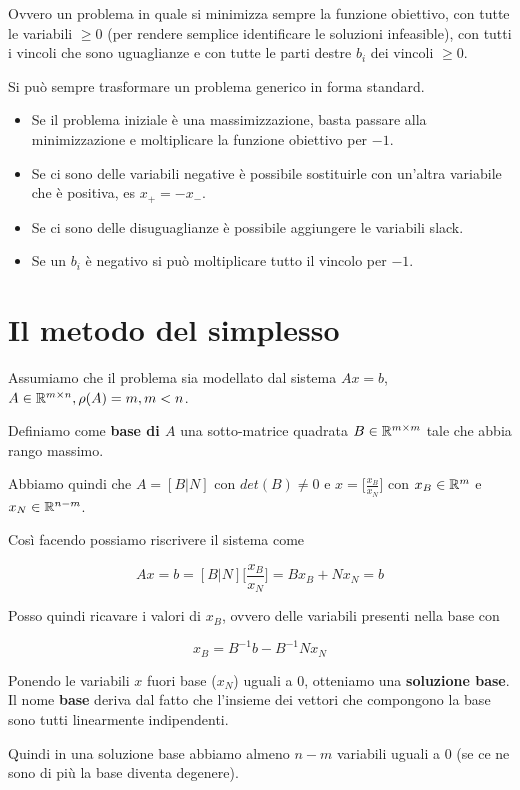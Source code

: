 \noindent Ovvero un problema in quale si minimizza sempre la funzione obiettivo, con tutte le variabili $\geq 0$ (per rendere semplice identificare le soluzioni infeasible), con tutti i vincoli che sono uguaglianze e con tutte le parti destre $b_i$ dei vincoli $\geq 0$.

Si può sempre trasformare un problema generico in forma standard.

\begin{itemize}
	\item Se il problema iniziale è una massimizzazione, basta passare alla minimizzazione e moltiplicare la funzione obiettivo per $-1$.
	\item Se ci sono delle variabili negative è possibile sostituirle con un'altra variabile che è positiva, es $x_+ = - x_-$.
	\item Se ci sono delle disuguaglianze è possibile aggiungere le variabili slack.
	\item Se un $b_i$ è negativo si può moltiplicare tutto il vincolo per $-1$. 
\end{itemize}

\section{Il metodo del simplesso}

\noindent Assumiamo che il problema sia modellato dal sistema $Ax = b$, $A \in \mathbb{R}^{m\times n}, \rho(A) = m, m <n$.

Definiamo come \textbf{base di $A$} una sotto-matrice quadrata $B \in \mathbb{R}^{m \times m }$ tale che abbia rango massimo. 

Abbiamo quindi che $A = [B|N]$ con $det(B) \neq 0$ e $x = \Bigg[ \frac{x_B}{x_N} \Bigg]$ con $x_B \in \mathbb{R}^m$ e $x_N \in \mathbb{R}^{n-m}$.

Così facendo possiamo riscrivere il sistema come 

$$
Ax = b = [B|N]\Bigg[ \frac{x_B}{x_N} \Bigg] = B x_B + N x_N =b
$$

\noindent Posso quindi ricavare i valori di $x_B$, ovvero delle variabili presenti nella base con

$$
x_B = B^{-1}b - B^{-1}N x_N
$$

\noindent Ponendo le variabili $x$ fuori base ($x_N$) uguali a 0, otteniamo una \textbf{soluzione base}.
Il nome \textbf{base} deriva dal fatto che l'insieme dei vettori che compongono la base sono tutti linearmente indipendenti.

Quindi in una soluzione base abbiamo almeno $n-m$ variabili uguali a 0 (se ce ne sono di più la base diventa degenere).

